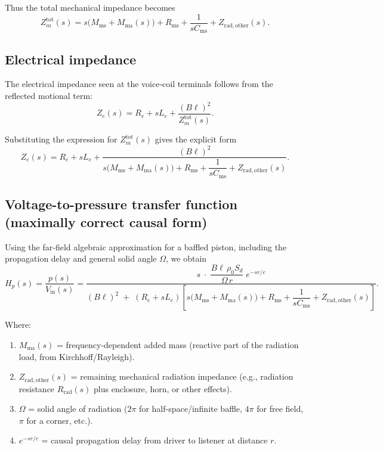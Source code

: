 Thus the total mechanical impedance becomes
\[
Z_m^{\mathrm{tot}}(s)= s\bigl(M_{\mathrm{ms}}+M_{\mathrm{ma}}(s)\bigr) + R_{\mathrm{ms}} + \frac{1}{sC_{\mathrm{ms}}} + Z_{\mathrm{rad,other}}(s).
\]

\subsection{Electrical impedance}

The electrical impedance seen at the voice‑coil terminals follows from the reflected motional term:
\[
\boxed{
Z_e(s) = R_e + sL_e + \frac{(B\ell)^2}{Z_m^{\mathrm{tot}}(s)}.
}
\]

Substituting the expression for \(Z_m^{\mathrm{tot}}(s)\) gives the explicit form
\[
\boxed{
Z_e(s) = R_e + sL_e +
\frac{(B\ell)^2}{
s\bigl(M_{\mathrm{ms}} + M_{\mathrm{ma}}(s)\bigr)
+ R_{\mathrm{ms}} + \dfrac{1}{sC_{\mathrm{ms}}}
+ Z_{\mathrm{rad,other}}(s)
}
}.
\]

\subsection{Voltage-to-pressure transfer function (maximally correct causal form)}

Using the far‑field algebraic approximation for a baffled piston, including the propagation delay and general solid angle \(\Omega\), we obtain
\[
\boxed{
H_p(s) = \frac{p(s)}{V_{\mathrm{in}}(s)}
= \frac{ s \;\cdot\; \dfrac{B\ell \,\rho_0 S_d}{\Omega \, r} \; e^{-s r/c} }
{ (B\ell)^2 \;+\; (R_e + s L_e) \left[ s\bigl(M_{\mathrm{ms}} + M_{\mathrm{ma}}(s)\bigr) + R_{\mathrm{ms}} + \dfrac{1}{s C_{\mathrm{ms}}} + Z_{\mathrm{rad,other}}(s) \right] }
}.
\]

Where:
\begin{enumerate}
  \item \(M_{\mathrm{ma}}(s)\) = frequency‑dependent added mass (reactive part of the radiation load, from Kirchhoff/Rayleigh).
  \item \(Z_{\mathrm{rad,other}}(s)\) = remaining mechanical radiation impedance (e.g., radiation resistance \(R_{\mathrm{rad}}(s)\) plus enclosure, horn, or other effects).
  \item \(\Omega\) = solid angle of radiation (\(2\pi\) for half‑space/infinite baffle, \(4\pi\) for free field, \(\pi\) for a corner, etc.).
  \item \(e^{-s r/c}\) = causal propagation delay from driver to listener at distance \(r\).
\end{enumerate}

